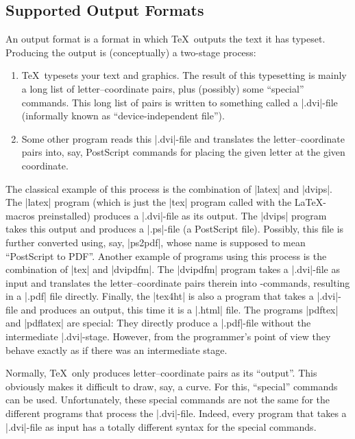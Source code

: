 \subsection{Supported Output Formats}
\label{section-drivers}

An output format is a format in which \TeX\ outputs the text it has typeset.
Producing the output is (conceptually) a two-stage process:
%
\begin{enumerate}
    \item \TeX\ typesets your text and graphics. The result of this
        typesetting is mainly a long list of letter--coordinate pairs, plus
        (possibly) some ``special'' commands. This long list of pairs is
        written to something called a |.dvi|-file (informally known as
        ``device-independent file'').
    \item Some other program reads this |.dvi|-file and translates the
        letter--coordinate pairs into, say, PostScript commands for placing
        the given letter at the given coordinate.
\end{enumerate}

The classical example of this process is the combination of |latex| and
|dvips|. The |latex| program (which is just the |tex| program called with the
\LaTeX-macros preinstalled) produces a |.dvi|-file as its output. The |dvips|
program takes this output and produces a |.ps|-file (a PostScript file).
Possibly, this file is further converted using, say, |ps2pdf|, whose name is
supposed to mean ``PostScript to PDF''. Another example of programs using this
process is the combination of |tex| and |dvipdfm|. The |dvipdfm| program takes
a |.dvi|-file as input and translates the letter--coordinate pairs therein into
\pdf-commands, resulting in a |.pdf| file directly. Finally, the |tex4ht| is
also a program that takes a |.dvi|-file and produces an output, this time it is
a |.html| file. The programs |pdftex| and |pdflatex| are special: They directly
produce a |.pdf|-file without the intermediate |.dvi|-stage. However, from the
programmer's point of view they behave exactly as if there was an intermediate
stage.

Normally, \TeX\ only produces letter--coordinate pairs as its ``output''. This
obviously makes it difficult to draw, say, a curve. For this, ``special''
commands can be used. Unfortunately, these special commands are not the same
for the different programs that process the |.dvi|-file. Indeed, every program
that takes a |.dvi|-file as input has a totally different syntax for the
special commands.

